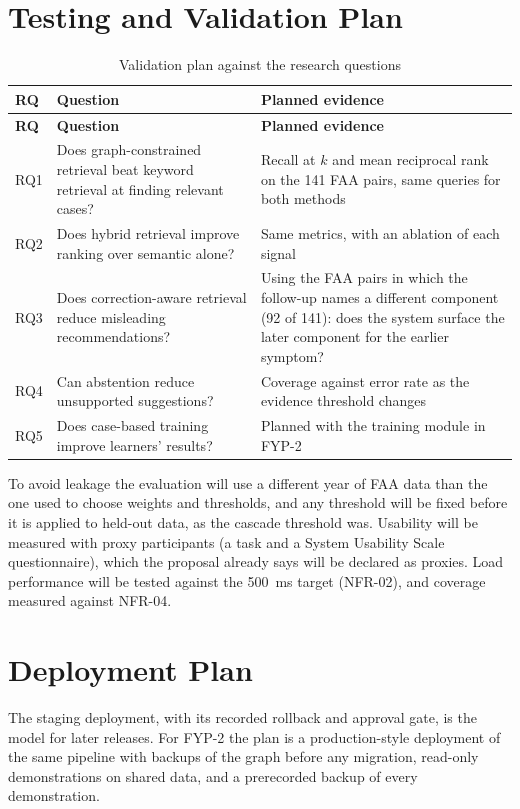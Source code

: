 \section{Testing and Validation Plan}
\begin{longtable}{p{}p{}p{}}
\caption{Validation plan against the research questions}\label{tab:valplan}\\
\toprule \textbf{RQ} & \textbf{Question} & \textbf{Planned evidence} \\ \midrule \endfirsthead
\toprule \textbf{RQ} & \textbf{Question} & \textbf{Planned evidence} \\ \midrule \endhead
RQ1 & Does graph-constrained retrieval beat keyword retrieval at finding relevant cases? & Recall at $k$ and mean reciprocal rank on the 141 FAA pairs, same queries for both methods \\
RQ2 & Does hybrid retrieval improve ranking over semantic alone? & Same metrics, with an ablation of each signal \\
RQ3 & Does correction-aware retrieval reduce misleading recommendations? & Using the FAA pairs in which the follow-up names a different component (92 of 141): does the system surface the later component for the earlier symptom? \\
RQ4 & Can abstention reduce unsupported suggestions? & Coverage against error rate as the evidence threshold changes \\
RQ5 & Does case-based training improve learners' results? & Planned with the training module in FYP-2 \\
\bottomrule
\end{longtable}
To avoid leakage the evaluation will use a different year of FAA data than the one used to choose weights and thresholds, and any threshold will be fixed before it is applied to held-out data, as the cascade threshold was. Usability will be measured with proxy participants (a task and a System Usability Scale questionnaire), which the proposal already says will be declared as proxies. Load performance will be tested against the 500~ms target (NFR-02), and coverage measured against NFR-04.

\section{Deployment Plan}
The staging deployment, with its recorded rollback and approval gate, is the model for later releases. For FYP-2 the plan is a production-style deployment of the same pipeline with backups of the graph before any migration, read-only demonstrations on shared data, and a prerecorded backup of every demonstration.

